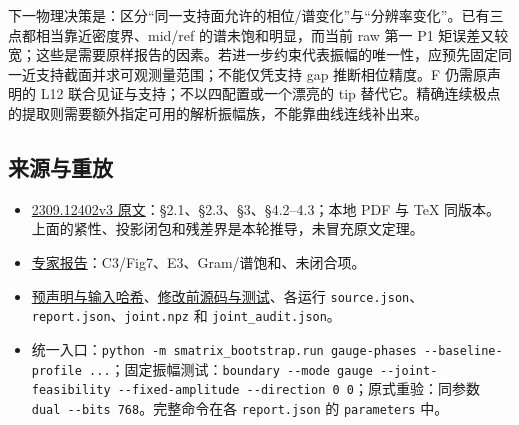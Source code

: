 \documentclass[
  11pt,
  a4paper,
]{article}
\providecommand{\tightlist}{%
  \setlength{\itemsep}{0pt}\setlength{\parskip}{0pt}}
\begin{document}
下一物理决策是：区分``同一支持面允许的相位/谱变化''与``分辨率变化''。已有三点都相当靠近密度界、mid/ref
的谱未饱和明显，而当前 raw 第一 P1
矩误差又较宽；这些是需要原样报告的因素。若进一步约束代表振幅的唯一性，应预先固定同一近支持截面并求可观测量范围；不能仅凭支持
gap 推断相位精度。F 仍需原声明的 L12
联合见证与支持；不以四配置或一个漂亮的 tip
替代它。精确连续极点的提取则需要额外指定可用的解析振幅族，不能靠曲线连线补出来。

\subsection{来源与重放}\label{ux6765ux6e90ux4e0eux91cdux653e}

\begin{itemize}
\tightlist
\item
  \href{https://arxiv.org/html/2309.12402v3}{2309.12402v3
  原文}：§2.1、§2.3、§3、§4.2--4.3；本地 PDF 与 TeX
  同版本。上面的紧性、投影闭包和残差界是本轮推导，未冒充原文定理。
\item
  \href{../../reports/expert_review_20260910/He_Kruczenski_2309v3_Expert_Review_ZH.pdf}{专家报告}：C3/Fig7、E3、Gram/谱饱和、未闭合项。
\item
  \href{AUDIT_PLAN.json}{预声明与输入哈希}、\href{before_source.json.gz}{修改前源码与测试}、各运行
  \texttt{source.json}、\texttt{report.json}、\texttt{joint.npz} 和
  \texttt{joint\_audit.json}。
\item
  统一入口：\texttt{python\ -m\ smatrix\_bootstrap.run\ gauge-phases\ -\/-baseline-profile\ ...}；固定振幅测试：\texttt{boundary\ -\/-mode\ gauge\ -\/-joint-feasibility\ -\/-fixed-amplitude\ -\/-direction\ 0\ 0}；原式重验：同参数
  \texttt{dual\ -\/-bits\ 768}。完整命令在各 \texttt{report.json} 的
  \texttt{parameters} 中。
\end{itemize}
\end{document}
